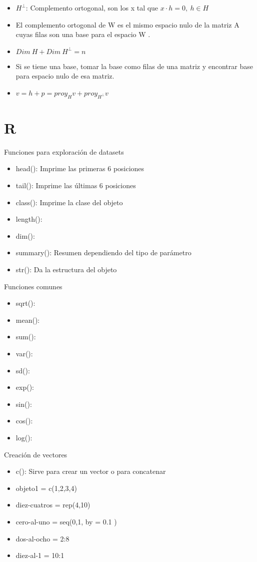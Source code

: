 \begin{itemize}
	\item $H^{\perp}$: Complemento ortogonal, son los x tal que $x\cdot h=0, \ h\in H$
	\item El complemento ortogonal de W es el mismo espacio nulo de la matriz A cuyas filas son una base para el espacio W .
	\item $Dim\ H + Dim\ H^{\perp}=n$
	\item Si se tiene una  base, tomar la base como filas de una matriz y encontrar base para espacio nulo de esa matriz.
	\item $v=h+p=proy_Hv+proy_{H^{\perp}}v$
\end{itemize}






\section{R}
Funciones para exploración de datasets
\begin{itemize}
	\item head(): Imprime las primeras 6 posiciones
	\item tail(): Imprime las últimas 6 posiciones
	\item class(): Imprime la clase del objeto
	\item length(): 
	\item dim():
	\item summary(): Resumen dependiendo del tipo de parámetro
	\item str(): Da la estructura del objeto
\end{itemize}

Funciones comunes
\begin{itemize}
	\item sqrt():
	\item mean():
	\item sum():
	\item var():
	\item sd():
	\item exp(): 
	\item sin(): 
	\item cos(): 
	\item log(): 
\end{itemize}

Creación de vectores
\begin{itemize}
	\item c(): Sirve para crear un vector o para concatenar
	\item objeto1 = c(1,2,3,4)
	\item diez-cuatros = rep(4,10)
	\item cero-al-uno = seq(0,1, by = 0.1 )
	\item dos-al-ocho = 2:8
	\item diez-al-1 = 10:1
\end{itemize}

